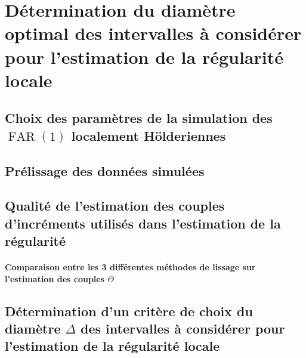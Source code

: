 \chapter{Détermination du diamètre optimal des intervalles à considérer pour l'estimation de la régularité locale }
\minitoc%

\section{Choix des paramètres de la simulation des $\operatorname{FAR}(1)$ localement Hölderiennes}



\section{Prélissage des données simulées}




% 
% 
% 


\section{Qualité de l'estimation des couples d'incréments utilisés dans l'estimation de la régularité}



\subsubsection{Comparaison entre les 3 différentes méthodes de lissage sur l'estimation des couples $\Theta$}



\section{Détermination d'un critère de choix du diamètre $\Delta$ des intervalles à considérer pour l'estimation de la régularité locale}



